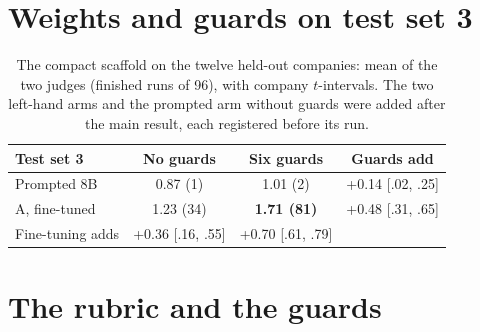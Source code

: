 \documentclass[11pt]{article}
\begin{document}
\section{Weights and guards on test set 3}
\label{app:grid}

\begin{table}[h]
\centering
\small
\setlength{\tabcolsep}{8pt}
\begin{tabular}{lccc}
\toprule
Test set 3 & No guards & Six guards & Guards add \\
\midrule
Prompted 8B & 0.87 (1) & 1.01 (2) & +0.14 [.02, .25] \\
A, fine-tuned & 1.23 (34) & \textbf{1.71 (81)} & +0.48 [.31, .65] \\
\midrule
Fine-tuning adds & +0.36 [.16, .55] & +0.70 [.61, .79] & \\
\bottomrule
\end{tabular}
\caption{The compact scaffold on the twelve held-out companies: mean of the two judges (finished runs of 96), with
company $t$-intervals. The two left-hand arms and the prompted arm without guards were added after the main result,
each registered before its run.}
\label{tab:grid}
\end{table}

\section{The rubric and the guards}
\label{app:instrument}
\end{document}
